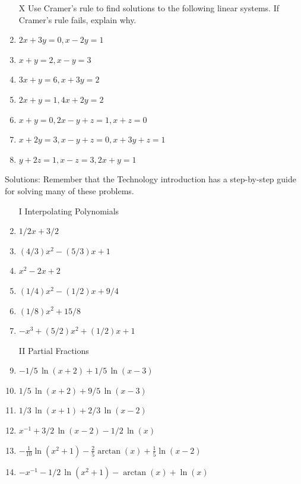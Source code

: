 \documentclass[10pt]{amsart}
\begin{document}
\begin{multicols}{2}
\begin{enumerate}
\vspace{.3in}
\item[X] Use Cramer's rule to find solutions to the following linear systems. If Cramer's rule fails, explain why.

\item $2x+3y=0, x-2y=1$
\item $x+y=2, x-y=3$
\item $3x+y=6, x+3y=2$
\item $2x+y=1, 4x+2y=2$
\item $x+y=0, 2x-y+z=1, x+z=0$
\item $x+2y=3, x-y+z=0, x+3y+z=1$
\item $y+2z=1, x-z=3, 2x+y=1$



\end{enumerate}









\small
Solutions: Remember that the Technology introduction has a step-by-step guide for solving many of these problems.
\begin{enumerate}

\item[I] Interpolating Polynomials
\item $1/2 x + 3/2$
\item $(4/3)x^2-(5/3)x+1$
\item $x^2-2x+2$
\item $(1/4)x^2-(1/2)x+9/4$
\item $(1/8)x^2+15/8$
\item $-x^3+(5/2)x^2+(1/2)x+1$




\item[II] Partial Fractions
\item $-1/5\,\ln  \left( x+2 \right) +1/5\,\ln  \left( x-3 \right)$
\item $1/5\,\ln  \left( x+2 \right) +9/5\,\ln  \left( x-3 \right) $
\item $1/3\,\ln  \left( x+1 \right) +2/3\,\ln  \left( x-2 \right) $
\item ${x}^{-1}+3/2\,\ln  \left( x-2 \right) -1/2\,\ln  \left( x \right)$
\item $-\frac{1}{10}\ln  \left( {x}^{2}+1 \right) -\frac{2}{5}\arctan \left( x \right) +\frac{1}{5}\ln  \left( x-2 \right) $
\item $-{x}^{-1}-1/2\,\ln  \left( {x}^{2}+1 \right) -\arctan \left( x
 \right) +\ln  \left( x \right)
$




\end{enumerate}
\end{multicols}
\end{document}
